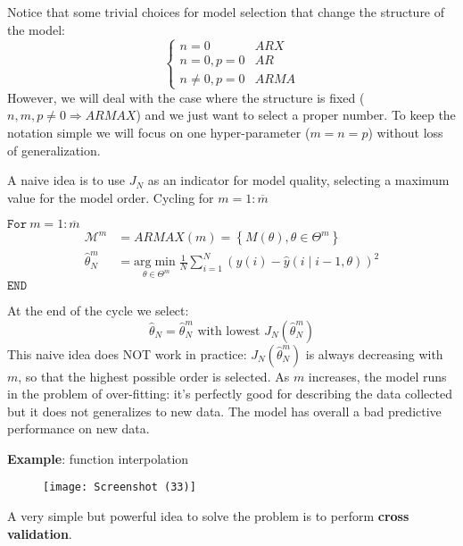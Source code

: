 Notice that some trivial choices for model selection that change the structure of the model:
\begin{equation*}
\begin{cases}
n=0 & ARX\\
n=0,p=0 & AR\\
n\neq 0,p=0 & ARMA
\end{cases}
\end{equation*}
However, we will deal with the case where the structure is fixed ($ n,m,p\neq 0\Longrightarrow ARMAX$) and we just want to select a proper number. To keep the notation simple we will focus on one hyper-parameter ($ m=n=p$) without loss of generalization.



A naive idea is to use $ J_{N}$ as an indicator for model quality, selecting a maximum value for the model order. Cycling for $ m=1:\overline{m}$

$ \mathtt{For }\ m=1:\overline{m}$
\begin{equation*}
\begin{aligned}
\mathcal{M}^{m} & =ARMAX(m) =\left\{M(\theta) ,\theta \in \Theta ^{m}\right\}\\
\hat{\theta }_{N}^{m} & =\underset{\theta \in \Theta ^{m}}{\mathrm{arg}\min}\frac{1}{N}\sum _{i=1}^{N}(y(i) -\hat{y}(i\mid i-1,\theta))^{2}
\end{aligned}
\end{equation*}
$ \mathtt{END}$

At the end of the cycle we select:
\begin{equation*}
\hat{\theta }_{N} =\hat{\theta }_{N}^{m} \text{ with lowest } J_{N}\left(\hat{\theta }_{N}^{m}\right)
\end{equation*}
This naive idea does NOT work in practice: $ J_{N}\left(\hat{\theta }_{N}^{m}\right)$ is always decreasing with $ m$, so that the highest possible order is selected. As $ m$ increases, the model runs in the problem of over-fitting: it's perfectly good for describing the data collected but it does not generalizes to new data. The model has overall a bad predictive performance on new data.



\textbf{Example}: function interpolation
\begin{figure}[htpb]
    \centering
    \texttt{[image: Screenshot (33)]}
\end{figure}
\FloatBarrier

A very simple but powerful idea to solve the problem is to perform \textbf{cross validation}.

